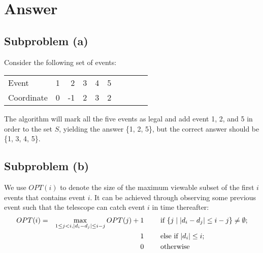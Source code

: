 \documentclass[12pt,letterpaper]{article}
\begin{document}
\section*{Answer}
\subsection*{Subproblem (a)}
Consider the following set of events:
\begin{table}[!h]
\begin{center}
\begin{tabular}{lrrrrrrrrr}
\hline
Event & 1 & 2 & 3 & 4 & 5\\
Coordinate & 0 & -1 & 2 & 3 & 2\\
\hline
\end{tabular}
\end{center}
\end{table}

The algorithm will mark all the five events as legal and add event 1, 2, and 5 in order to the set $S$, yielding the answer \{1, 2, 5\}, but the correct answer should be \{1, 3, 4, 5\}.

\subsection*{Subproblem (b)}
We use $OPT(i)$ to denote the size of the maximum viewable subset of the first $i$ events that contains event $i$. It can be achieved through observing some previous event such that the telescope can catch event $i$ in time thereafter:
\begin{align}
\nonumber OPT(i) & = & \max_{1\le j < i, |d_i-d_j|\le i-j}{OPT(j)}+1 & \textrm{\hspace{2em} if }\{j\mid |d_i-d_j|\le i-j\}\ne \emptyset;\\\nonumber
 & & 1 & \textrm{\hspace{2em} else if }|d_i|\le i;\\
 & & 0 & \textrm{\hspace{2em} otherwise}
\end{align}
\end{document}
